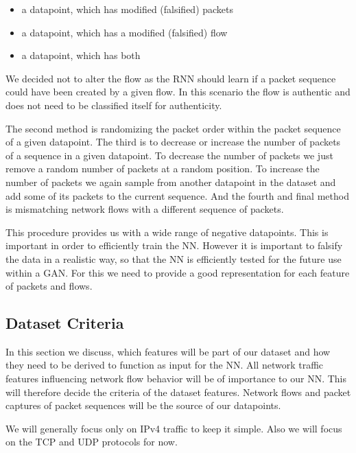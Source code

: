 \documentclass[
	ngerman,
	ruledheaders=section,%
	class=report,%
	thesis={type=bachelor},%
	accentcolor=9c,%
	custommargins=true,%
	marginpar=false,%
	parskip=half-,%
	fontsize=11pt,%
]{tudapub}
\begin{document}
\begin{itemize}
    \item a datapoint, which has modified (falsified) packets
    \item a datapoint, which has a modified (falsified) flow
    \item a datapoint, which has both
\end{itemize}

We decided not to alter the flow as the RNN should learn if a packet sequence could have been created by a given flow.
In this scenario the flow is authentic and does not need to be classified itself for authenticity.

The second method is randomizing the packet order within the packet sequence of a given datapoint.
The third is to decrease or increase the number of packets of a sequence in a given datapoint.
To decrease the number of packets we just remove a random number of packets at a random position.
To increase the number of packets we again sample from another datapoint in the dataset and add some of its packets to the current sequence.
And the fourth and final method is mismatching network flows with a different sequence of packets.

This procedure provides us with a wide range of negative datapoints.
This is important in order to efficiently train the NN.
However it is important to falsify the data in a realistic way, so that the NN is efficiently tested for the future use within a GAN.
For this we need to provide a good representation for each feature of packets and flows.

\subsection{Dataset Criteria}

In this section we discuss, which features will be part of our dataset and how they need to be derived to function as input for the NN.
All network traffic features influencing network flow behavior will be of importance to our NN.
This will therefore decide the criteria of the dataset features.
Network flows and packet captures of packet sequences will be the source of our datapoints.

We will generally focus only on IPv4 traffic to keep it simple.
Also we will focus on the TCP and UDP protocols for now.

\end{document}
